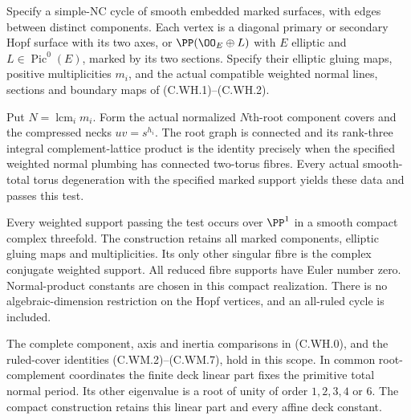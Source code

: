 
\begin{proposition}\label{cdp:st:C.2.UN.59}
Specify a simple-NC cycle of smooth embedded marked surfaces, with
edges between distinct components. Each vertex is a diagonal primary
or secondary Hopf surface with its two axes, or
$\PP(\OO_E\oplus L)$ with $E$ elliptic and
$L\in\operatorname{Pic}^0(E)$, marked by its two sections.
Specify their elliptic gluing maps, positive multiplicities $m_i$,
and the actual compatible weighted normal lines, sections and
boundary maps of (C.WH.1)--(C.WH.2).

Put $N=\operatorname{lcm}_i m_i$. Form the actual normalized
$N$th-root component covers and the compressed necks $uv=s^{h_i}$.
The root graph is connected and its rank-three integral
complement-lattice product is the identity precisely when the
specified weighted normal plumbing has connected two-torus fibres.
Every actual smooth-total torus degeneration with the specified
marked support yields these data and passes this test.

Every weighted support passing the test occurs over $\PP^1$ in a
smooth compact complex threefold. The construction retains all
marked components, elliptic gluing maps and multiplicities. Its
only other singular fibre is the complex conjugate weighted
support. All reduced fibre supports have Euler number zero.
Normal-product constants are chosen in this compact realization.
There is no algebraic-dimension restriction on the Hopf vertices,
and an all-ruled cycle is included.

The complete component, axis and inertia comparisons in
(C.WH.0), and the ruled-cover identities (C.WM.2)--(C.WM.7),
hold in this scope. In common root-complement coordinates the
finite deck linear part fixes the primitive total normal period.
Its other eigenvalue is a root of unity of order $1,2,3,4$ or $6$.
The compact construction retains this linear part and every
affine deck constant.
\end{proposition}

